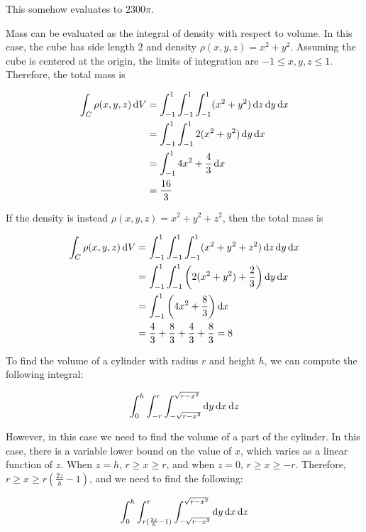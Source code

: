 This somehow evaluates to $2300\pi$.


Mass can be evaluated as the integral of density with respect to volume. In this case, the cube has side length 2 and density $\rho(x, y, z) = x^2 + y^2$. Assuming the cube is centered at the origin, the limits of integration are $-1 \leq x, y, z \leq 1$. Therefore, the total mass is

\begin{align*}
  \int_C \rho(x, y, z) \mathop{}\!\mathrm{d} V &= \int_{-1}^1 \int_{-1}^1 \int_{-1}^1 (x^2 + y^2) \mathop{}\!\mathrm{d} z \mathop{}\!\mathrm{d} y \mathop{}\!\mathrm{d} x \\
  &= \int_{-1}^1 \int_{-1}^1 2(x^2 + y^2) \mathop{}\!\mathrm{d} y \mathop{}\!\mathrm{d} x \\
  &= \int_{-1}^1 4x^2 + \frac{4}{3} \mathop{}\!\mathrm{d} x \\
  &= \frac{16}{3}
\end{align*}

If the density is instead $\rho(x, y, z) = x^2 + y^2 + z^2$, then the total mass is

\begin{align*}
  \int_C \rho(x, y, z) \mathop{}\!\mathrm{d} V &= \int_{-1}^1 \int_{-1}^1 \int_{-1}^1 (x^2 + y^2 + z^2) \mathop{}\!\mathrm{d} z \mathop{}\!\mathrm{d} y \mathop{}\!\mathrm{d} x \\
  &= \int_{-1}^1 \int_{-1}^1 \left(2(x^2 + y^2) + \frac{2}{3}\right) \mathop{}\!\mathrm{d} y \mathop{}\!\mathrm{d} x \\
  &= \int_{-1}^1 \left(4x^2 + \frac{8}{3}\right) \mathop{}\!\mathrm{d} x \\
  &= \frac{4}{3} + \frac{8}{3} + \frac{4}{3} + \frac{8}{3} = 8
\end{align*}

To find the volume of a cylinder with radius $r$ and height $h$, we can compute the following integral:

\begin{align*}
  \int_0^h \int_{-r}^{r} \int_{-\sqrt{r - x^2}}^{\sqrt{r - x^2}} \mathop{}\!\mathrm{d} y \mathop{}\!\mathrm{d} x \mathop{}\!\mathrm{d} z
\end{align*}

However, in this case we need to find the volume of a part of the cylinder. In this case, there is a variable lower bound on the value of $x$, which varies as a linear function of $z$. When $z = h$, $r \geq x \geq r$, and when $z = 0$, $r \geq x \geq -r$. Therefore, $r \geq x \geq r(\frac{2z}{h} - 1)$, and we need to find the following:

\begin{align*}
  \int_0^h \int_{r(\frac{2z}{h} - 1)}^{r} \int_{-\sqrt{r - x^2}}^{\sqrt{r - x^2}} \mathop{}\!\mathrm{d} y \mathop{}\!\mathrm{d} x \mathop{}\!\mathrm{d} z
\end{align*}

